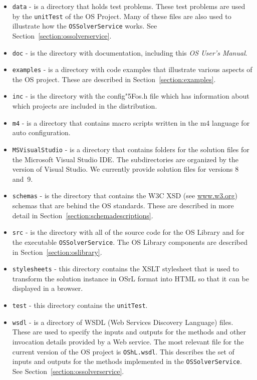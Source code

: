 \documentclass[11pt]{article}
\renewcommand{\_}{{\char"5F}}
\renewcommand{\{}{{\char"7B}}
\renewcommand{\}}{{\char"7D}}
\renewcommand{\^}{{\char"0D}}
\renewcommand{\'}{{\char"0D}}
\begin{document}
\begin{enumerate}[Step 1:]
\begin{itemize}
\item {\tt data} - is a directory that holds test problems. These test problems are used by the
{\tt unitTest} of the OS Project. Many of these files are also used to illustrate
how the {\tt OSSolverService} works.
See Section~\ref{section:ossolverservice}.

\item {\tt doc} - is the directory with documentation, including this {\it OS User's Manual}.

\item {\tt examples} - is a directory with code examples that illustrate various aspects of the OS project.
These are described in Section~\ref{section:examples}.

\item {\tt inc} - is the directory with the config\_os.h file which has information about which projects
are included in the distribution.

\item {\tt m4} - is a directory that  contains macro scripts written in the m4 language for auto configuration.

\item {\tt MSVisualStudio} - is a directory that  contains folders for the solution files for the
Microsoft Visual Studio IDE.  The subdirectories are organized by the version
of Visual Studio. We currently provide solution files for versions 8 and~9.

\item {\tt schemas} - is the directory that contains the W3C XSD (see \url{www.w3.org}) schemas that are
behind the OS standards. These are described in more detail in Section~\ref{section:schemadescriptions}.

\item {\tt src} - is the directory with all of the source code for the OS Library and for the executable
{\tt OSSolverService}. The OS Library components are described in Section~\ref{section:oslibrary}.

\item {\tt stylesheets} - this directory contains the XSLT stylesheet that is used to transform the solution
instance in OSrL format into HTML so that it can be displayed in a browser.

\item {\tt test} - this directory contains the {\tt unitTest}.


\item  {\tt wsdl} - is a directory of WSDL (Web Services Discovery Language) files. These are used to specify
the inputs and outputs for the methods and other invocation details provided by a Web service. The most relevant
file for the current version of the OS project is {\tt OShL.wsdl}.
This describes the set of inputs and outputs for the methods implemented in the {\tt OSSolverService}.
See Section~\ref{section:ossolverservice}.


\end{itemize}
\end{enumerate}
\end{document}
